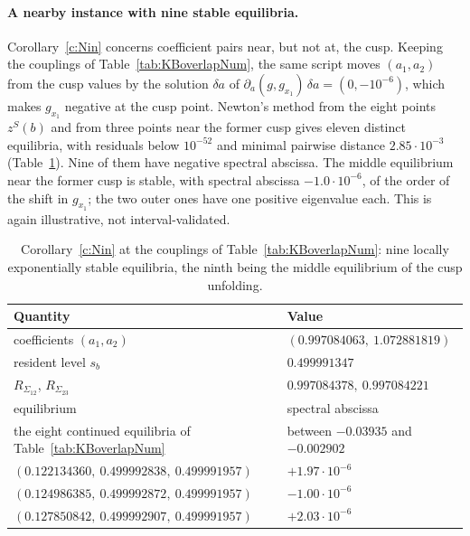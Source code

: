 \paragraph{A nearby instance with nine stable equilibria.}
Corollary~\ref{c:Nin} concerns coefficient pairs near, but not at, the cusp.
Keeping the couplings of Table~\ref{tab:KBoverlapNum}, the same script moves
$(a_1,a_2)$ from the cusp values by the solution $\delta a$ of
$\partial_a(g,g_{x_1})\,\delta a=(0,-10^{-6})$, which makes $g_{x_1}$ negative at
the cusp point. Newton's method from the eight points $z^S(b)$ and from three
points near the former cusp gives eleven distinct equilibria, with residuals
below $10^{-52}$ and minimal pairwise distance $2.85\cdot10^{-3}$
(Table~\ref{tab:KBnineNum}). Nine of them have negative spectral abscissa. The
middle equilibrium near the former cusp is stable, with spectral abscissa
$-1.0\cdot10^{-6}$, of the order of the shift in $g_{x_1}$; the two outer ones
have one positive eigenvalue each. This is again illustrative, not
interval-validated.
\begin{table}[H]
\centering\small
\begin{tabular}{ll}
\hline
Quantity & Value\\\hline
coefficients $(a_1,a_2)$ & $(0.997084063,\ 1.072881819)$\\
resident level $s_b$ & $0.499991347$\\
$R_{\Sigma_{12}}$, $R_{\Sigma_{23}}$ & $0.997084378,\ 0.997084221$\\\hline
equilibrium & spectral abscissa\\\hline
the eight continued equilibria of Table~\ref{tab:KBoverlapNum} & between $-0.03935$ and $-0.002902$\\
$(0.122134360,\ 0.499992838,\ 0.499991957)$ & $+1.97\cdot10^{-6}$\\
$(0.124986385,\ 0.499992872,\ 0.499991957)$ & $-1.00\cdot10^{-6}$\\
$(0.127850842,\ 0.499992907,\ 0.499991957)$ & $+2.03\cdot10^{-6}$\\\hline
\end{tabular}
\caption{Corollary~\ref{c:Nin} at the couplings of Table~\ref{tab:KBoverlapNum}:
nine locally exponentially stable equilibria, the ninth being the middle
equilibrium of the cusp unfolding.}
\label{tab:KBnineNum}
\end{table}

